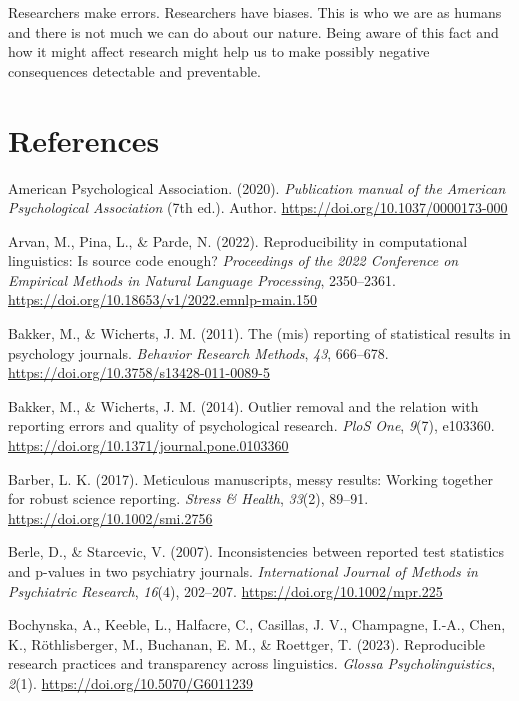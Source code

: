 \documentclass[
  doc,
  longtable,
  nolmodern,
  notxfonts,
  notimes,
  colorlinks=true,linkcolor=blue,citecolor=blue,urlcolor=blue]{apa7}
\newlength{\cslhangindent}
\newenvironment{CSLReferences}[2] %
 {\begin{list}{}{%
  \setlength{\itemindent}{0pt}
  \setlength{\leftmargin}{0pt}
  \setlength{\parsep}{0pt}
  \ifodd #1
   \setlength{\leftmargin}{\cslhangindent}
   \setlength{\itemindent}{-1\cslhangindent}
  \fi
  \setlength{\itemsep}{#2\baselineskip}}}
 {\end{list}}
\begin{document}
Researchers make errors. Researchers have biases. This is who we are as
humans and there is not much we can do about our nature. Being aware of
this fact and how it might affect research might help us to make
possibly negative consequences detectable and preventable.

\section{References}\label{references}

\label{refs}
\begin{CSLReferences}{1}{0}
American Psychological Association. (2020). \emph{Publication manual of
the {American Psychological Association}} (7th ed.). Author.
\url{https://doi.org/10.1037/0000173-000}

Arvan, M., Pina, L., \& Parde, N. (2022). Reproducibility in
computational linguistics: Is source code enough? \emph{Proceedings of
the 2022 Conference on Empirical Methods in Natural Language
Processing}, 2350--2361.
\url{https://doi.org/10.18653/v1/2022.emnlp-main.150}

Bakker, M., \& Wicherts, J. M. (2011). The (mis) reporting of
statistical results in psychology journals. \emph{Behavior Research
Methods}, \emph{43}, 666--678.
\url{https://doi.org/10.3758/s13428-011-0089-5}

Bakker, M., \& Wicherts, J. M. (2014). Outlier removal and the relation
with reporting errors and quality of psychological research. \emph{PloS
One}, \emph{9}(7), e103360.
\url{https://doi.org/10.1371/journal.pone.0103360}

Barber, L. K. (2017). Meticulous manuscripts, messy results: Working
together for robust science reporting. \emph{Stress \& Health},
\emph{33}(2), 89--91. \url{https://doi.org/10.1002/smi.2756}

Berle, D., \& Starcevic, V. (2007). Inconsistencies between reported
test statistics and p-values in two psychiatry journals.
\emph{International Journal of Methods in Psychiatric Research},
\emph{16}(4), 202--207. \url{https://doi.org/10.1002/mpr.225}

Bochynska, A., Keeble, L., Halfacre, C., Casillas, J. V., Champagne,
I.-A., Chen, K., Röthlisberger, M., Buchanan, E. M., \& Roettger, T.
(2023). Reproducible research practices and transparency across
linguistics. \emph{Glossa Psycholinguistics}, \emph{2}(1).
\url{https://doi.org/10.5070/G6011239}


\end{CSLReferences}
\end{document}
